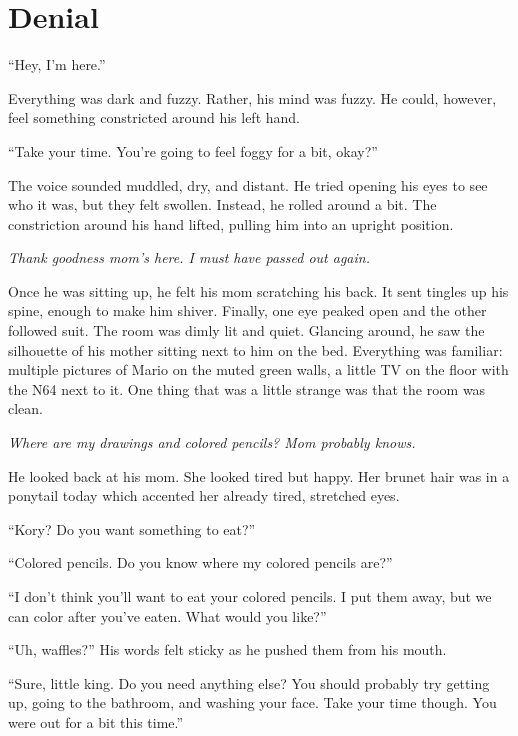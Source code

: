 \chapter*{Denial}


``Hey, I'm here.''

Everything was dark and fuzzy. Rather, his mind was fuzzy. He could, however, feel something constricted around his left hand.

``Take your time. You're going to feel foggy for a bit, okay?''

The voice sounded muddled, dry, and distant. He tried opening his eyes to see who it was, but they felt swollen. Instead, he rolled around a bit. The constriction around his hand lifted, pulling him into an upright position.

\textit{Thank goodness mom's here. I must have passed out again.}

Once he was sitting up, he felt his mom scratching his back. It sent tingles up his spine, enough to make him shiver. Finally, one eye peaked open and the other followed suit. The room was dimly lit and quiet. Glancing around, he saw the silhouette of his mother sitting next to him on the bed. Everything was familiar: multiple pictures of Mario on the muted green walls, a little TV on the floor with the N64 next to it. One thing that was a little strange was that the room was clean.

\textit{Where are my drawings and colored pencils? Mom probably knows.}

He looked back at his mom. She looked tired but happy. Her brunet hair was in a ponytail today which accented her already tired, stretched eyes.

``Kory? Do you want something to eat?''

``Colored pencils. Do you know where my colored pencils are?''

``I don't think you'll want to eat your colored pencils. I put them away, but we can color after you've eaten. What would you like?''

``Uh, waffles?'' His words felt sticky as he pushed them from his mouth.

``Sure, little king. Do you need anything else? You should probably try getting up, going to the bathroom, and washing your face. Take your time though. You were out for a bit this time.''

